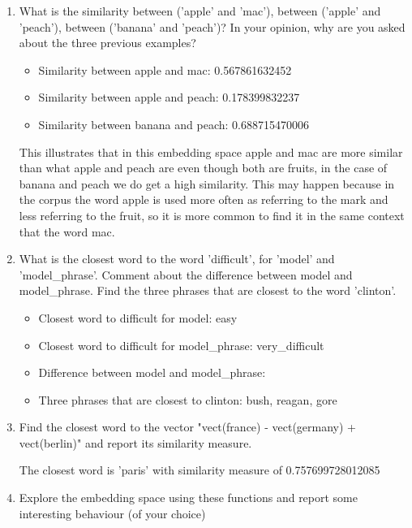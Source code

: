 \documentclass{article} %
\begin{document}
\begin{enumerate}
    \item
    What is the similarity between (’apple’ and ’mac’), between (’apple’ and ’peach’),
    between (’banana’ and ’peach’)? In your opinion, why are you asked about
    the three previous examples?

    \begin{itemize}
        \item
        Similarity between apple and mac: 0.567861632452

        \item
        Similarity between apple and peach: 0.178399832237

        \item
        Similarity between banana and peach: 0.688715470006
    \end{itemize}

    This illustrates that in this embedding space apple and mac are more similar than
    what apple and peach are even though both are fruits, in the case of banana and peach
    we do get a high similarity. This may happen because in the corpus the word apple
    is used more often as referring to the mark and less referring to the fruit, so it
    is more common to find it in the same context that the word mac.

    \item
    What is the closest word to the word 'difficult', for 'model' and 'model\_phrase'.
    Comment about the difference between model and model\_phrase. Find the three phrases
    that are closest to the word 'clinton'.

    \begin{itemize}
        \item
        Closest word to difficult for model: easy

        \item
        Closest word to difficult for model\_phrase: very\_difficult

        \item
        Difference between model and model\_phrase: %

        \item
        Three phrases that are closest to clinton: bush, reagan, gore
    \end{itemize}

    \item
    Find the closest word to the vector "vect(france) - vect(germany) + vect(berlin)" and
    report its similarity measure.

    The closest word is 'paris' with similarity measure of 0.757699728012085

    \item
    Explore the embedding space using these functions and report some interesting
    behaviour (of your choice)


\end{enumerate}
\end{document}
